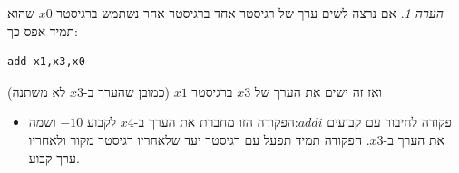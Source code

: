 \documentclass[12pt]{article}
\theoremstyle{plain}
\theoremstyle{definition}
\theoremstyle{remark}
\newtheorem*{remark}{הערה}                %
\begin{document}
\begin{remark}
אם נרצה לשים ערך של רגיסטר אחד ברגיסטר אחר נשתמש ברגיסטר \({x0}\) שהוא תמיד אפס כך:\begin{LTR}\begin{lstlisting}[language=assembly]
add x1,x3,x0

\end{lstlisting}\end{LTR}ואז זה ישים את הערך של \({x3}\) ברגיסטר \({x1}\) (כמובן שהערך ב-\({x3}\) לא משתנה)
\end{remark}
\begin{itemize}
\item פקודה לחיבור עם קבועים \({addi}\):הפקודה הזו מחברת את הערך ב-\({x4}\) לקבוע \({-10}\) ושמה את הערך ב-\({x3}\).\newline{}
הפקודה תמיד תפעל עם רגיסטר יעד שלאחריו רגיסטר מקור ולאחריו ערך קבוע.
\end{itemize}
\end{document}
